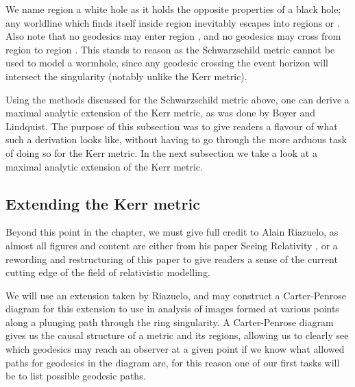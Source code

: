 \documentclass[oneside,openright,frontopenright, singlespacing]{dmathesis}
\begin{document}
\vspace{1em}
	We name region  a white hole as it holds the opposite properties of a black hole; any worldline which finds itself inside region  inevitably escapes into regions  or . Also note that no geodesics may enter region , and no geodesics may cross from region  to region . This stands to reason as the Schwarzschild metric cannot be used to model a wormhole, since any geodesic crossing the event horizon will intersect the singularity (notably unlike the Kerr metric).

\vspace{1em}
	Using the methods discussed for the Schwarzschild metric above, one can derive a maximal analytic extension of the Kerr metric, as was done by Boyer and Lindquist. The purpose of this subsection was to give readers a flavour of what such a derivation looks like, without having to go through the more arduous task of doing so for the Kerr metric. In the next subsection we take a look at a maximal analytic extension of the Kerr metric.

\subsection{Extending the Kerr metric}\label{subsec:Section6.1.2}

	Beyond this point in the chapter, we must give full credit to Alain Riazuelo, as almost all figures and content are either from his paper Seeing Relativity \cite{seeingRelativity}, or a rewording and restructuring of this paper to give readers a sense of the current cutting edge of the field of relativistic modelling.

\vspace{1em}
	We will use an extension taken by Riazuelo, and may construct a Carter-Penrose diagram for this extension to use in analysis of images formed at various points along a plunging path through the ring singularity. A Carter-Penrose diagram gives us the causal structure of a metric and its regions, allowing us to clearly see which geodesics may reach an observer at a given point if we know what allowed paths for geodesics in the diagram are, for this reason one of our first tasks will be to list possible geodesic paths.
\end{document}
